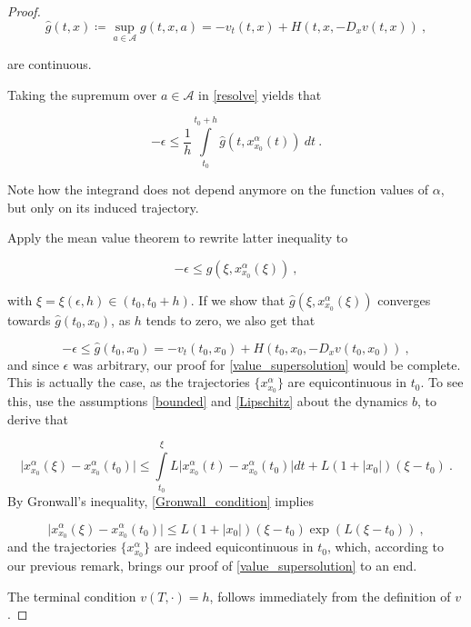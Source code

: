 \begin{theorem}
\begin{proof}
		\begin{equation*}
			\hat{g}(t, x) \coloneqq \sup\limits_{a \in \mathcal{A}} g(t, x, a) = -v_t(t, x) + H(t, x, -D_x v(t, x)) \ ,
		\end{equation*}
		
		are continuous.
		
		Taking the supremum over $ a \in \mathcal{A} $ in \eqref{resolve} yields that
		
		\begin{equation*}
			- \epsilon \leq \frac{1}{h} \int\limits^{t_0 + h}_{t_0} \hat{g}(t, x^{\alpha}_{x_0}(t)) \ dt \ .
		\end{equation*}
		
		Note how the integrand does not depend anymore on the function values of $ \alpha $, but only on its induced trajectory.
		
		Apply the mean value theorem to rewrite latter inequality to
		
		\begin{equation*}
			- \epsilon \leq \hat{g}(\xi, x^{\alpha}_{x_0}(\xi)) \ ,
		\end{equation*}
		
		with $ \xi = \xi(\epsilon, h) \in \left( t_0, t_0 + h \right) $. If we show that $ \hat{g}(\xi, x^{\alpha}_{x_0}(\xi)) $ converges towards $ \hat{g}(t_0, x_0) $, as $ h $ tends to zero, we also get that
		
		\begin{equation*}
			-\epsilon \leq \hat{g}(t_0, x_0) = -v_t(t_0, x_0) + H(t_0, x_0, -D_x v(t_0, x_0)) \ ,
		\end{equation*}
		and since $ \epsilon $ was arbitrary, our proof for \eqref{value_supersolution} would be complete. This is actually the case, as the trajectories $ \{ x^{\alpha}_{x_0} \} $ are equicontinuous in $ t_0 $. To see this, use the assumptions \eqref{bounded} and \eqref{Lipschitz} about the dynamics $ b $, to derive that
		
		\begin{equation}
			\label{Gronwall_condition}
			\lvert x^{\alpha}_{x_0} (\xi) - x^{\alpha}_{x_0} (t_0) \rvert \leq \int\limits^{\xi}_{t_0} L \lvert x^{\alpha}_{x_0} (t) - x^{\alpha}_{x_0} (t_0) \rvert dt + L(1 + \lvert x_0 \rvert)(\xi - t_0) \ .
		\end{equation}
		By Gronwall's inequality, \eqref{Gronwall_condition} implies
		
		\begin{equation}
		\label{trajectory equicontinuous}
				\lvert x^{\alpha}_{x_0} (\xi) - x^{\alpha}_{x_0} (t_0) \rvert \leq L(1 + \lvert x_0 \rvert)(\xi - t_0) \exp(L(\xi - t_0)) \ ,
		\end{equation}
		and the trajectories $ \{ x^{\alpha}_{x_0} \} $ are indeed equicontinuous in $ t_0 $, which, according to our previous remark, brings our proof of \eqref{value_supersolution} to an end.
		
		The terminal condition $ v(T, \cdot) = h $, follows immediately from the definition of $ v $.
	\end{proof}
\end{theorem}
